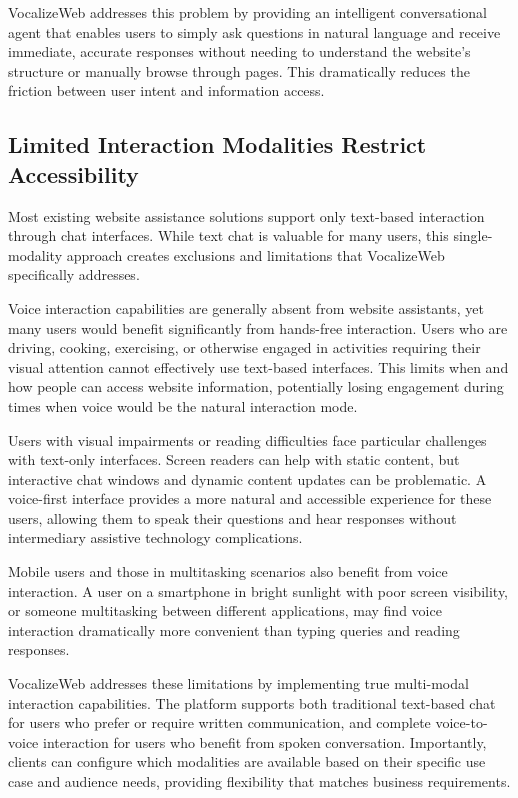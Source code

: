 VocalizeWeb addresses this problem by providing an intelligent conversational agent that enables users to simply ask questions in natural language and receive immediate, accurate responses without needing to understand the website's structure or manually browse through pages. This dramatically reduces the friction between user intent and information access.

\subsection{Limited Interaction Modalities Restrict Accessibility}

Most existing website assistance solutions support only text-based interaction through chat interfaces. While text chat is valuable for many users, this single-modality approach creates exclusions and limitations that VocalizeWeb specifically addresses.

Voice interaction capabilities are generally absent from website assistants, yet many users would benefit significantly from hands-free interaction. Users who are driving, cooking, exercising, or otherwise engaged in activities requiring their visual attention cannot effectively use text-based interfaces. This limits when and how people can access website information, potentially losing engagement during times when voice would be the natural interaction mode.

Users with visual impairments or reading difficulties face particular challenges with text-only interfaces. Screen readers can help with static content, but interactive chat windows and dynamic content updates can be problematic. A voice-first interface provides a more natural and accessible experience for these users, allowing them to speak their questions and hear responses without intermediary assistive technology complications.

Mobile users and those in multitasking scenarios also benefit from voice interaction. A user on a smartphone in bright sunlight with poor screen visibility, or someone multitasking between different applications, may find voice interaction dramatically more convenient than typing queries and reading responses.

VocalizeWeb addresses these limitations by implementing true multi-modal interaction capabilities. The platform supports both traditional text-based chat for users who prefer or require written communication, and complete voice-to-voice interaction for users who benefit from spoken conversation. Importantly, clients can configure which modalities are available based on their specific use case and audience needs, providing flexibility that matches business requirements.


